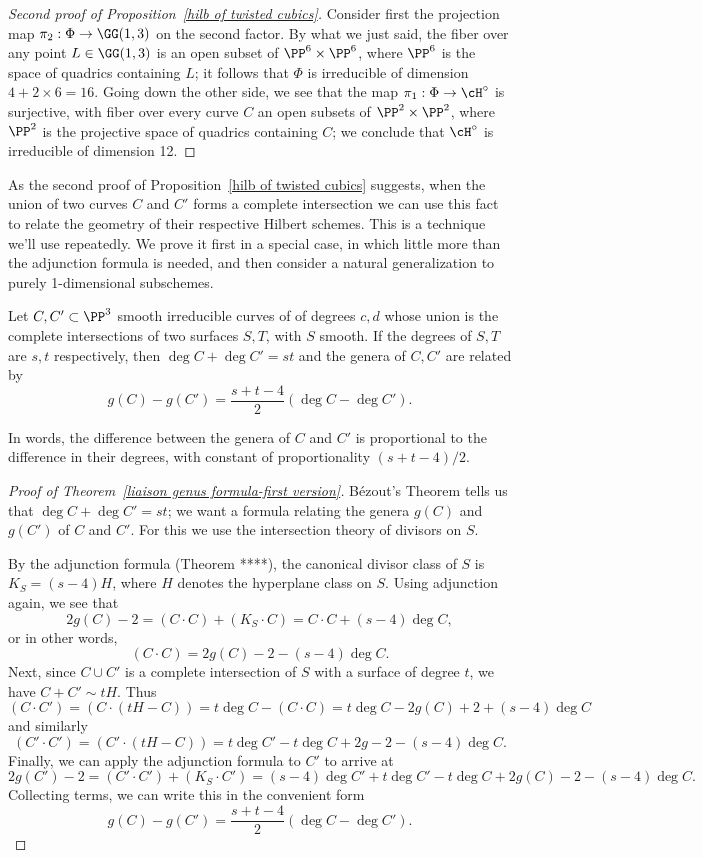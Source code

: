 \begin{proof}[Second proof of Proposition~\ref{hilb of twisted cubics}]
Consider first the projection map $\pi_2 : \Phi \to \GG(1,3)$ on the second factor. By what we just said, the fiber over any point $L \in \GG(1,3)$ is an open subset of $\PP^6 \times \PP^6$, where $\PP^6$ is the space of quadrics containing $L$; it follows that $\Phi$ is irreducible of dimension $4 + 2\times 6 = 16$. Going down the other side, we see that the map $\pi_1 : \Phi \to \cH^\circ$ is surjective, with fiber over every curve $C$ an open subsets of $\PP^2 \times \PP^2$, where $\PP^{2}$ is the projective space of quadrics containing $C$; we conclude that $\cH^\circ$ is irreducible of dimension 12.
\end{proof}

As the second proof of Proposition~\ref{hilb of twisted cubics} suggests, when the union of two curves $C$ and $C'$ forms a complete intersection we can use this fact to relate the geometry of their respective Hilbert schemes. This is a technique we'll use repeatedly. We prove it first in a special case, in which little more
than the adjunction formula is needed, and then consider a natural
generalization to purely 1-dimensional subschemes.

\begin{theorem}\label{liaison genus formula-first version} Let $C, {C'}\subset \PP^3$ smooth irreducible curves of  of degrees $c,d$ whose union is the complete intersections of two surfaces $S,T$, with $S$ smooth. If the degrees of $S,T$ are $s,t$ respectively, then $\deg C+\deg C' = st$ and the genera of $C,C'$ are
related by
 $$
 g(C) - g({C'}) = \frac{s+t-4}{2}(\deg C-\deg {C'}).
 $$
\end{theorem}
In words, the difference between the genera of $C$ and ${C'}$ is proportional to the difference in their degrees, with constant of proportionality $(s+t-4)/2$.

\begin{proof}[Proof of Theorem~\ref{liaison genus formula-first version}]
B\'ezout's Theorem tells us that $\deg C+\deg {C'} = st$; we want a formula relating the genera $g(C)$ and $g({C'})$ of $C$ and ${C'}$. For this we use
 the intersection theory of divisors on $S$.

By the adjunction formula (Theorem ****), the canonical divisor class of $S$ is $K_S = (s - 4)H$, where $H$ denotes the hyperplane class on $S$. Using adjunction 
again, we see that
$$
2g(C)-2 = (C\cdot C) + (K_S\cdot C) = C\cdot C + (s-4)\deg C, 
$$
or in other words,
$$
(C \cdot C) = 2g(C)-2 - (s-4)\deg C.
$$
Next, since $C \cup {C'}$ is a complete intersection of $S$ with a surface of degree $t$, we have $C + {C'}\sim tH$. Thus 
$$
(C \cdot {C'}) = (C \cdot (tH - C)) = t\deg C - (C \cdot C) = t\deg C - 2g(C) + 2 + (s-4)\deg C
$$
and similarly
$$
({C'} \cdot {C'}) = ({C'} \cdot (tH - C)) = t\deg {C'} - t\deg C + 2g - 2 - (s-4)\deg C. 
$$
Finally, we can apply the adjunction formula to ${C'}$ to arrive at
$$
2g(C') - 2 = ({C'} \cdot {C'}) + (K_S \cdot {C'}) = (s-4)\deg {C'}  + t\deg {C'} - t\deg C + 2g(C) - 2 - (s-4)\deg C.
$$
Collecting terms, we can write this in the convenient form
$$
g(C)-g(C') = \frac{s+t-4}{2}(\deg {C}-\deg C').
$$
 \end{proof}

